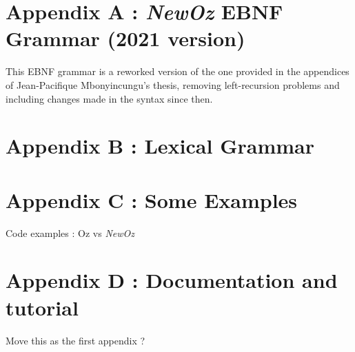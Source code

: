 
\section*{Appendix A : \textit{NewOz} EBNF Grammar (2021 version)}\label{sec:appendix-grammar}
This EBNF grammar is a reworked version of the one provided in the appendices of Jean-Pacifique Mbonyincungu's thesis,
removing left-recursion problems and including changes made in the syntax since then.


\section*{Appendix B : Lexical Grammar}\label{sec:appendix-lexical-grammar}


\section*{Appendix C : Some Examples}\label{sec:appendix-examples}
Code examples : Oz vs \textit{NewOz}


\section*{Appendix D : Documentation and tutorial}\label{sec:appendix-doc}
Move this as the first appendix ?